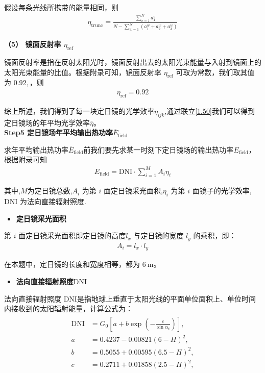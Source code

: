 \documentclass[../main.tex]{subfiles}
\begin{document}
\par 假设每条光线所携带的能量相同，则
\begin{align}\label{1.45}
  \eta _{\text{trunc}}=\frac{\sum_{v=1}^N{a_4^v}}{N-\sum_{w=1}^N{\left( a_{1}^{w}+a_{2}^{w}+a_{3}^{w} \right)}}
\end{align}
\par \textbf{（5） 镜面反射率 $\eta_{\text{ref}}$}
\par 镜面反射率是指在反射太阳光时，镜面反射出去的太阳光束能量与入射到镜面上的太阳光束能量的比值。根据附录可知，镜面反射率 $\eta_{\text{ref}}$ 可取为常数，我们取其值为 $0.92,$，则
\begin{align}\label{1.46}
  \eta_{\text{ref}}=0.92
\end{align}
\par 综上所述，我们得到了每一块定日镜的光学效率\(\eta_{ijk}\),通过联立\eqref{1.50}我们可以得到定日镜场的年平均光学效率\(\bar{\eta}\)。
 \\ \noindent \textbf{Step5 定日镜场年平均输出热功率$\overline{E}_{\text{field}}$}
 \par 求年平均输出热功率$\overline{E}_{\text{field}}$前我们要先求某一时刻下定日镜场的输出热功率$E_{\text{field}}$，根据附录可知
 \begin{align}\label{1.47}
  E_{\text{field}} = \text{DNI} \cdot \sum_{i = 1}^{M} A_i \eta_i
 \end{align}
\par 其中,$M$为定日镜总数,$A_i$ 为第 $i$ 面定日镜采光面积,$\eta_i$ 为第 $i$ 面镜子的光学效率,$\text{DNI}$ 为法向直接辐射照度.
\begin{itemize}
  \item \textbf{定日镜采光面积}
\end{itemize}
\par 第 $i$ 面定日镜采光面积即定日镜的高度\( l_x \) 与定日镜的宽度 \( l_y \) 的乘积，即：
\begin{align}\label{1.48}
  A_i = l_x \cdot l_y
 \end{align}
\par 在本题中，定日镜的长度和宽度相等，都为 \( 6\ \text{m} \)。
\begin{itemize}
  \item \textbf{法向直接辐射照度$\text{DNI}$ }
\end{itemize}
\par 法向直接辐射照度 $\text{DNI}$是指地球上垂直于太阳光线的平面单位面积上、单位时间内接收到的太阳辐射能量，计算公式为：
\begin{align}\label{1.49}
\begin{split}
\text{DNI} &= G_0 \left[ a + b \exp\left(-\frac{c}{\sin\alpha_{\text{s}}}\right) \right], \\
a &= 0.4237 - 0.00821(6 - H)^2, \\
b &= 0.5055 + 0.00595(6.5 - H)^2, \\
c &= 0.2711 + 0.01858(2.5 - H)^2,
\end{split}
\end{align}
\end{document}
